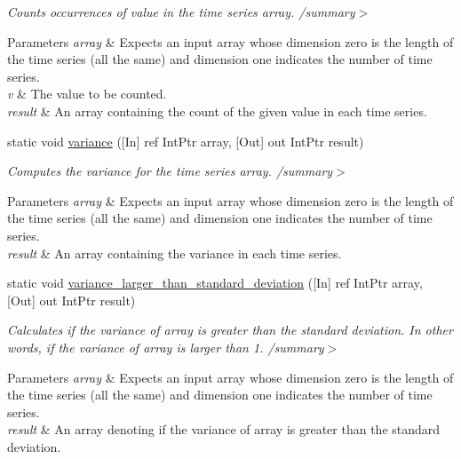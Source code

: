 \begin{DoxyCompactItemize}
\begin{DoxyCompactList}\small\item\em Counts occurrences of value in the time series array. /summary$>$ 
\begin{DoxyParams}{Parameters}
{\em array} & Expects an input array whose dimension zero is the length of the time series (all the same) and dimension one indicates the number of time series.\\
\hline
{\em v} & The value to be counted.\\
\hline
{\em result} & An array containing the count of the given value in each time series.\\
\hline
\end{DoxyParams}
\end{DoxyCompactList}\item 
static void \mbox{\hyperlink{classkhiva_1_1interop_1_1_d_l_l_features_ac4b7f5fc3d28280df33109144eda6f8a}{variance}} (\mbox{[}In\mbox{]} ref Int\+Ptr array, \mbox{[}Out\mbox{]} out Int\+Ptr result)
\begin{DoxyCompactList}\small\item\em Computes the variance for the time series array. /summary$>$ 
\begin{DoxyParams}{Parameters}
{\em array} & Expects an input array whose dimension zero is the length of the time series (all the same) and dimension one indicates the number of time series.\\
\hline
{\em result} & An array containing the variance in each time series.\\
\hline
\end{DoxyParams}
\end{DoxyCompactList}\item 
static void \mbox{\hyperlink{classkhiva_1_1interop_1_1_d_l_l_features_a467faca41be774c30029d492d73e1a8f}{variance\+\_\+larger\+\_\+than\+\_\+standard\+\_\+deviation}} (\mbox{[}In\mbox{]} ref Int\+Ptr array, \mbox{[}Out\mbox{]} out Int\+Ptr result)
\begin{DoxyCompactList}\small\item\em Calculates if the variance of array is greater than the standard deviation. In other words, if the variance of array is larger than 1. /summary$>$ 
\begin{DoxyParams}{Parameters}
{\em array} & Expects an input array whose dimension zero is the length of the time series (all the same) and dimension one indicates the number of time series.\\
\hline
{\em result} & An array denoting if the variance of array is greater than the standard deviation.\\
\hline
\end{DoxyParams}
\end{DoxyCompactList}\end{DoxyCompactItemize}


